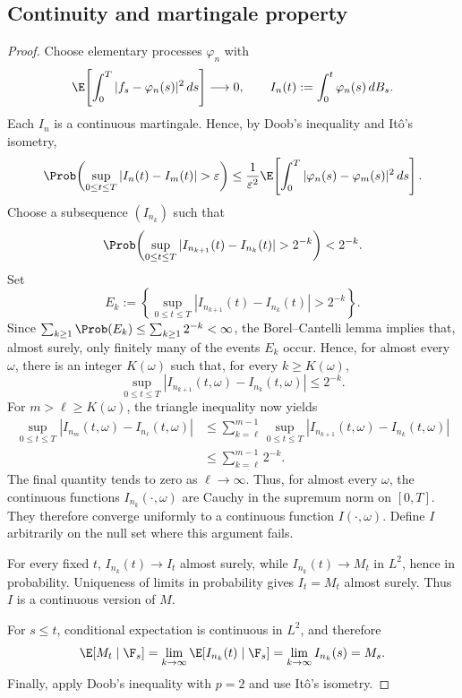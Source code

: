\subsection*{Continuity and martingale property}
\begin{proof}
Choose elementary processes $\varphi_n$ with
\[
 \E\!\left[\int_0^T|f_s-\varphi_n(s)|^2\,ds\right]\longrightarrow0,
 \qquad I_n(t):=\int_0^t\varphi_n(s)\,dB_s.
\]
Each $I_n$ is a continuous martingale. Hence, by Doob's inequality and
It\^o's isometry,
\[
 \Prob\!\left(\sup_{0\le t\le T}|I_n(t)-I_m(t)|>\varepsilon\right)
 \le\frac{1}{\varepsilon^2}\E\!\left[\int_0^T
 |\varphi_n(s)-\varphi_m(s)|^2\,ds\right].
\]
Choose a subsequence $(I_{n_k})$ such that
\[
 \Prob\!\left(\sup_{0\le t\le T}|I_{n_{k+1}}(t)-I_{n_k}(t)|>2^{-k}\right)<2^{-k}.
\]
Set
\[
 E_k:=\left\{\sup_{0\le t\le T}|I_{n_{k+1}}(t)-I_{n_k}(t)|>2^{-k}\right\}.
\]
Since $\sum_{k\ge1}\Prob(E_k)\le\sum_{k\ge1}2^{-k}<\infty$, the
Borel--Cantelli lemma implies that, almost surely, only finitely many of the
events $E_k$ occur. Hence, for almost every $\omega$, there is an integer
$K(\omega)$ such that, for every $k\ge K(\omega)$,
\[
 \sup_{0\le t\le T}|I_{n_{k+1}}(t,\omega)-I_{n_k}(t,\omega)|\le2^{-k}.
\]
For $m>\ell\ge K(\omega)$, the triangle inequality now yields
\[
 \begin{aligned}
 \sup_{0\le t\le T}|I_{n_m}(t,\omega)-I_{n_\ell}(t,\omega)|
 &\le\sum_{k=\ell}^{m-1}\sup_{0\le t\le T}
 |I_{n_{k+1}}(t,\omega)-I_{n_k}(t,\omega)|\\
 &\le\sum_{k=\ell}^{m-1}2^{-k}.
 \end{aligned}
\]
The final quantity tends to zero as $\ell\to\infty$. Thus, for almost every
$\omega$, the continuous functions $I_{n_k}(\cdot,\omega)$ are Cauchy in
the supremum norm on $[0,T]$. They therefore converge uniformly to a
continuous function $I(\cdot,\omega)$. Define $I$ arbitrarily on the null
set where this argument fails.

For every fixed $t$, $I_{n_k}(t)\to I_t$ almost surely, while
$I_{n_k}(t)\to M_t$ in $L^2$, hence in probability. Uniqueness of limits in
probability gives $I_t=M_t$ almost surely. Thus $I$ is a continuous version
of $M$.

For $s\le t$, conditional expectation is continuous in $L^2$, and therefore
\[
 \E[M_t\mid\F_s]
 =\lim_{k\to\infty}\E[I_{n_k}(t)\mid\F_s]
 =\lim_{k\to\infty}I_{n_k}(s)=M_s.
\]
Finally, apply Doob's inequality with $p=2$ and use It\^o's isometry.
\end{proof}

